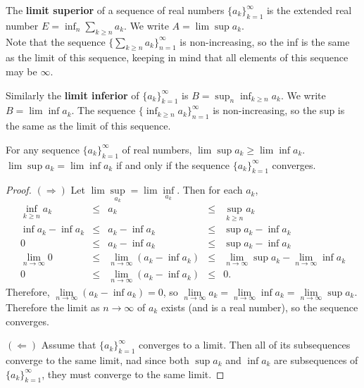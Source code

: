 \begin{defn}\label{d:limsup}%
	The \textbf{limit superior} of a sequence of real numbers 
	$\{a_k\}_{k=1}^\infty$ is the extended real number 
	$E = \inf_n \sum_{k\ge n} a_k$. We write $A = \lim\sup a_k$. \\
	Note that the sequence $\{\sum_{k\ge n}a_k\}_{n=1}^\infty$ is 
	non-increasing, so the inf is the same as the limit of this sequence, 
	keeping in mind that all elements of this sequence may be $\infty$. 

	Similarly the \textbf{limit inferior} of $\{a_k\}_{k=1}^\infty$ is 
	$B = \sup_n\inf_{k\ge n}a_k$. We write $B = \lim\inf a_k$. The sequence 
	$\{\inf_{k\ge n}a_k\}_{n=1}^\infty$ is non-increasing, so the sup is the 
	same as the limit of this sequence. 
\end{defn}

\begin{pblm}%
	For any sequence $\{a_k\}_{k=1}^\infty$ of real numbers, $\lim\sup a_k 
	\ge \lim\inf a_k$. $\lim\sup a_k = \lim\inf a_k$ if and only if the 
	sequence $\{a_k\}_{k=1}^\infty$ converges. 
\begin{proof}
	$(\Rightarrow)$ Let $\lim\sup\limits_{a_k} = \lim\inf\limits_{a_k}$. Then 
	for each $a_k$, 
	\begin{equation*}
	\begin{array}{rcccl}
		\inf\limits_{k\ge n}a_k & \le & a_k & \le & \sup\limits_{k\ge n} a_k \\
		\inf a_k - \inf a_k & \le & a_k - \inf a_k & \le & \sup a_k - \inf a_k\\
		0 & \le & a_k - \inf a_k & \le & \sup a_k - \inf a_k\\
		\lim\limits_{n\to\infty}0 & \le & \lim\limits_{n\to\infty}(a_k - \inf a_k ) & \le & \lim\limits_{n\to\infty} \sup a_k - \lim\limits_{n\to\infty}\inf a_k\\
		0 & \le & \lim\limits_{n\to\infty}(a_k - \inf a_k) & \le & 0. 
	\end{array}
	\end{equation*}
	Therefore, $\lim\limits_{n\to\infty}(a_k - \inf a_k) = 0$, so 
	$\lim\limits_{n\to\infty}a_k = \lim\limits_{n\to\infty}\inf a_k = 
	\lim\limits_{n\to\infty} \sup a_k$. Therefore the limit  as $n\to\infty$ of $a_k$ 
	exists (and is a real number), so the sequence converges. 

	\noindent$(\Leftarrow)$ Assume that $\{a_k\}_{k=1}^\infty$ converges to a limit. 
	Then all of its subsequences converge to the same limit, nad since both $\sup a_k$ 
	and $\inf a_k$ are subsequences of $\{a_k\}_{k=1}^\infty$, they must converge to 
	the same limit. 
\end{proof}
\end{pblm}

